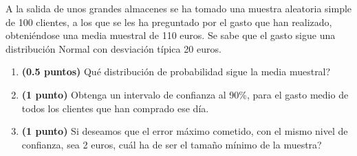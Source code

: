 
A la salida de unos grandes almacenes se ha tomado una muestra aleatoria simple de 100 clientes, a los que se les ha preguntado por el gasto que han realizado, obteniéndose una media muestral de 110 euros. Se sabe que el gasto sigue una distribución Normal con desviación típica 20 euros.
\begin{enumerate}[label=\alph*)]
\item \textbf{(0.5 puntos)} \textquestiondown{}Qué distribución de probabilidad sigue la media muestral?
\item \textbf{(1 punto)} Obtenga un intervalo de confianza al 90\%, para el gasto medio de todos los clientes que han comprado ese día.
\item \textbf{(1 punto)} Si deseamos que el error máximo cometido, con el mismo nivel de confianza, sea 2 euros, \textquestiondown{}cuál ha de ser el tamaño mínimo de la muestra?
\end{enumerate}
